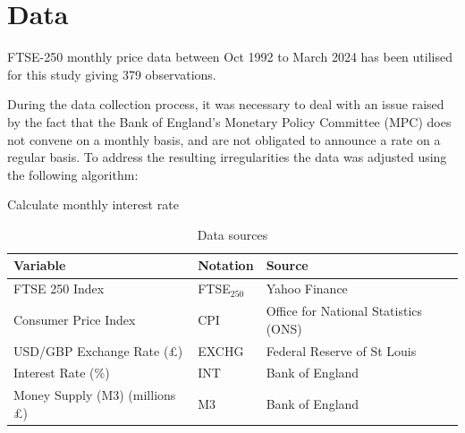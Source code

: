 \documentclass[11pt,a4paper]{article}
\begin{document}
\section{Data}

FTSE-250 monthly price data between Oct 1992 to March 2024 has been utilised for this study giving 379 observations.

During the data collection process, it was necessary to deal with an issue raised by the fact that the Bank of England’s Monetary Policy Committee (MPC) 
does not convene on a monthly basis, and are not obligated to 
announce a rate on a regular basis. To address the resulting irregularities the data was adjusted using the following algorithm:

\begin{algorithm}[H]
    \caption{Calculate monthly interest rate}
    \label{alg:interest_rate_adjustment}
    
\end{algorithm}


\begin{table}[h!]
    \centering
    \caption{Data sources}
    \begin{tabular}{lll}
        \toprule
        \textbf{Variable} & \textbf{Notation} & \textbf{Source} \\
        \midrule
        FTSE 250 Index & FTSE$_{250}$ & Yahoo Finance \\
        Consumer Price Index & CPI & Office for National Statistics (ONS) \\
        USD/GBP Exchange Rate (£) & EXCHG & Federal Reserve of St Louis \\
        Interest Rate ($\%$) & INT & Bank of England \\
        Money Supply (M3) (millions £) & M3 & Bank of England \\
        \bottomrule
    \end{tabular}
\end{table}
\end{document}
